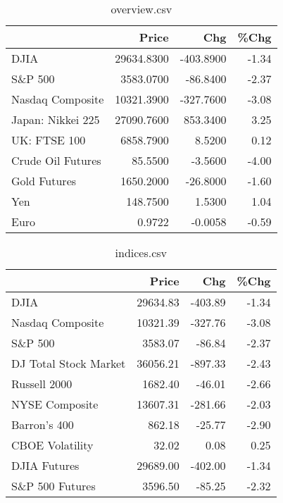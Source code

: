 \documentclass{article}%
\begin{document}
\begin{table}[htbp]%
\caption{overview.csv}%
\centering%
\begin{adjustbox}{width=1\textwidth}%
\begin{tabular}{lrrr}
\toprule
                  &      Price &       Chg &  \%Chg \\
\midrule
             DJIA & 29634.8300 & -403.8900 & -1.34 \\
          S\&P 500 &  3583.0700 &  -86.8400 & -2.37 \\
 Nasdaq Composite & 10321.3900 & -327.7600 & -3.08 \\
Japan: Nikkei 225 & 27090.7600 &  853.3400 &  3.25 \\
     UK: FTSE 100 &  6858.7900 &    8.5200 &  0.12 \\
Crude Oil Futures &    85.5500 &   -3.5600 & -4.00 \\
     Gold Futures &  1650.2000 &  -26.8000 & -1.60 \\
              Yen &   148.7500 &    1.5300 &  1.04 \\
             Euro &     0.9722 &   -0.0058 & -0.59 \\
\bottomrule
\end{tabular}
%
\end{adjustbox}%
\end{table}

%


\begin{table}[htbp]%
\caption{indices.csv}%
\centering%
\begin{adjustbox}{width=1\textwidth}%
\begin{tabular}{lrrr}
\toprule
                      &    Price &     Chg &  \%Chg \\
\midrule
                 DJIA & 29634.83 & -403.89 & -1.34 \\
     Nasdaq Composite & 10321.39 & -327.76 & -3.08 \\
              S\&P 500 &  3583.07 &  -86.84 & -2.37 \\
DJ Total Stock Market & 36056.21 & -897.33 & -2.43 \\
         Russell 2000 &  1682.40 &  -46.01 & -2.66 \\
       NYSE Composite & 13607.31 & -281.66 & -2.03 \\
         Barron's 400 &   862.18 &  -25.77 & -2.90 \\
      CBOE Volatility &    32.02 &    0.08 &  0.25 \\
         DJIA Futures & 29689.00 & -402.00 & -1.34 \\
      S\&P 500 Futures &  3596.50 &  -85.25 & -2.32 \\
\bottomrule
\end{tabular}
%
\end{adjustbox}%
\end{table}
\end{document}

